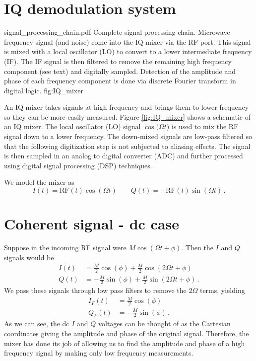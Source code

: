 \section{IQ demodulation system}

{signal_processing_chain.pdf}
{Complete signal processing chain. Microwave frequency signal (and noise) come into the IQ mixer via the RF port. This signal is mixed with a local oscillator (LO) to convert to a lower intermediate frequency (IF). The IF signal is then filtered to remove the remaining high frequency component (see text) and digitally sampled. Detection of the amplitude and phase of each frequency component is done via discrete Fourier transform in digital logic.}
{fig:IQ_mixer}

An IQ mixer takes signals at high frequency and brings them to lower frequency so they can be more easily measured.
Figure \ref{fig:IQ_mixer} shows a schematic of an IQ mixer.
The local oscillator (LO) signal $\cos(\Omega t$) is used to mix the RF signal down to a lower frequency.
The down-mixed signals are low-pass filtered so that the following digitization step is not subjected to aliasing effects.
The signal is then sampled in an analog to digital converter (ADC) and further processed using digital signal processing (DSP) techniques.

We model the mixer as
\begin{equation}
I(t) = \text{RF}(t) \cos(\Omega t) \qquad Q(t) = - \text{RF}(t) \sin(\Omega t) \, .
\end{equation}

\section{Coherent signal - dc case}

Suppose in the incoming RF signal were $M \cos(\Omega t + \phi)$.
Then the $I$ and $Q$ signals would be
\begin{align}
I(t) &= \frac{M}{2} \cos(\phi) + \frac{M}{2} \cos(2\Omega t + \phi) \\
Q(t) &= -\frac{M}{2} \sin(\phi) + \frac{M}{2} \sin(2\Omega t + \phi) \, .
\end{align}
We pass these signals through low pass filters to remove the $2 \Omega$ terms, yielding
\begin{align}
I_F(t) &= \frac{M}{2} \cos(\phi) \\
Q_F(t) &= -\frac{M}{2} \sin(\phi) \, .
\end{align}
As we can see, the dc $I$ and $Q$ voltages can be thought of as the Cartesian coordinates giving the amplitude and phase of the original signal.
Therefore, the mixer has done its job of allowing us to find the amplitude and phase of a high frequency signal by making only low frequency measurements.


